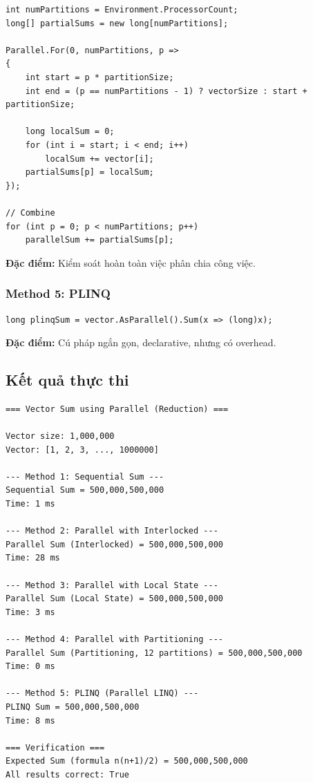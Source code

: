 \documentclass[12pt,a4paper]{article}
\begin{document}
\begin{lstlisting}[language=CSharp, caption={Manual Partitioning}]
int numPartitions = Environment.ProcessorCount;
long[] partialSums = new long[numPartitions];

Parallel.For(0, numPartitions, p =>
{
    int start = p * partitionSize;
    int end = (p == numPartitions - 1) ? vectorSize : start + partitionSize;
    
    long localSum = 0;
    for (int i = start; i < end; i++)
        localSum += vector[i];
    partialSums[p] = localSum;
});

// Combine
for (int p = 0; p < numPartitions; p++)
    parallelSum += partialSums[p];
\end{lstlisting}

\textbf{Đặc điểm:} Kiểm soát hoàn toàn việc phân chia công việc.

\subsubsection{Method 5: PLINQ}

\begin{lstlisting}[language=CSharp, caption={PLINQ}]
long plinqSum = vector.AsParallel().Sum(x => (long)x);
\end{lstlisting}

\textbf{Đặc điểm:} Cú pháp ngắn gọn, declarative, nhưng có overhead.

\subsection{Kết quả thực thi}

\begin{Verbatim}[frame=single, fontsize=\small]
=== Vector Sum using Parallel (Reduction) ===

Vector size: 1,000,000
Vector: [1, 2, 3, ..., 1000000]

--- Method 1: Sequential Sum ---
Sequential Sum = 500,000,500,000
Time: 1 ms

--- Method 2: Parallel with Interlocked ---
Parallel Sum (Interlocked) = 500,000,500,000
Time: 28 ms

--- Method 3: Parallel with Local State ---
Parallel Sum (Local State) = 500,000,500,000
Time: 3 ms

--- Method 4: Parallel with Partitioning ---
Parallel Sum (Partitioning, 12 partitions) = 500,000,500,000
Time: 0 ms

--- Method 5: PLINQ (Parallel LINQ) ---
PLINQ Sum = 500,000,500,000
Time: 8 ms

=== Verification ===
Expected Sum (formula n(n+1)/2) = 500,000,500,000
All results correct: True
\end{Verbatim}
\end{document}
